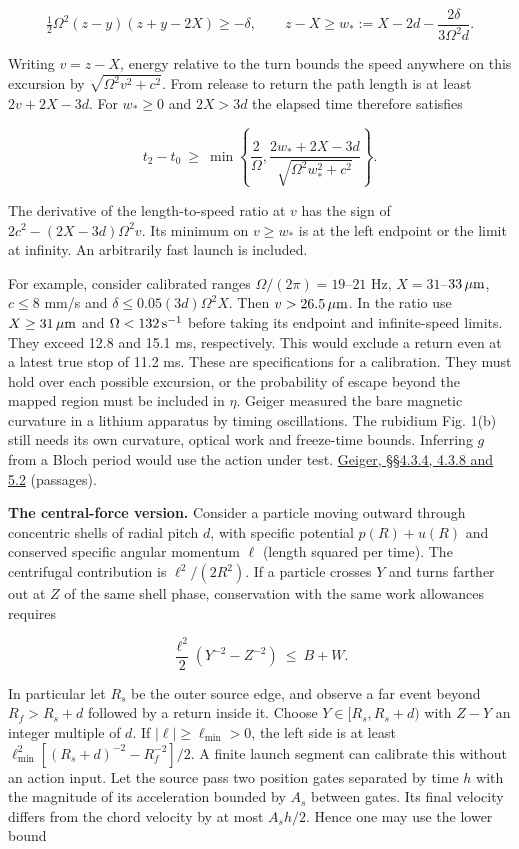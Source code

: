 \documentclass[11pt,a4paper]{article}
\begin{document}
\[
  \tfrac12\Omega^2(z-y)(z+y-2X)\ge-\delta,\qquad
  z-X\ge w_*:=X-2d-\frac{2\delta}{3\Omega^2d}.
\]

Writing \(v=z-X\), energy relative to the turn bounds the speed anywhere
on this excursion by \(\sqrt{\Omega^2v^2+c^2}\). From release to return
the path length is at least \(2v+2X-3d\). For \(w_*\ge0\) and \(2X>3d\)
the elapsed time therefore satisfies

\[
 t_2-t_0\ \ge\
 \min\left\{\frac{2}{\Omega},
       \frac{2w_*+2X-3d}{\sqrt{\Omega^2w_*^2+c^2}}\right\}.
\]

The derivative of the length-to-speed ratio at \(v\) has the sign of
\(2c^2-(2X-3d)\Omega^2v\). Its minimum on \(v\ge w_*\) is at the left
endpoint or the limit at infinity. An arbitrarily fast launch is
included.

For example, consider calibrated ranges \(\Omega/(2\pi)=19\)--\(21\) Hz,
\(X=31\)--\(33\,\mu{\rm m}\), \(c\le8\) mm/s and
\(\delta\le0.05(3d)\Omega^2X\). Then \(v>26.5\,\mu{\rm m}\). In the
ratio use \(X\ge31\,\mu{\rm m}\) and \(\Omega<132\,{\rm s}^{-1}\) before
taking its endpoint and infinite-speed limits. They exceed 12.8 and 15.1
ms, respectively. This would exclude a return even at a latest true stop
of 11.2 ms. These are specifications for a calibration. They must hold
over each possible excursion, or the probability of escape beyond the
mapped region must be included in \(\eta\). Geiger measured the bare
magnetic curvature in a lithium apparatus by timing oscillations. The
rubidium Fig. 1(b) still needs its own curvature, optical work and
freeze-time bounds. Inferring \(g\) from a Bloch period would use the
action under test.
\href{https://web.physics.ucsb.edu/~weld/publications/Geiger.pdf}{Geiger,
§§4.3.4, 4.3.8 and 5.2} (passages).

\textbf{The central-force version.} Consider a particle moving outward
through concentric shells of radial pitch \(d\), with specific potential
\(p(R)+u(R)\) and conserved specific angular momentum \(\ell\) (length
squared per time). The centrifugal contribution is \(\ell^2/(2R^2)\). If
a particle crosses \(Y\) and turns farther out at \(Z\) of the same
shell phase, conservation with the same work allowances requires

\[
                 \frac{\ell^2}{2}(Y^{-2}-Z^{-2})\ \le\ B+W.
\]

In particular let \(R_s\) be the outer source edge, and observe a far
event beyond \(R_f>R_s+d\) followed by a return inside it. Choose
\(Y\in[R_s,R_s+d)\) with \(Z-Y\) an integer multiple of \(d\). If
\(|\ell|\ge\ell_{\min}>0\), the left side is at least
\(\ell_{\min}^2[(R_s+d)^{-2}-R_f^{-2}]/2\). A finite launch segment can
calibrate this without an action input. Let the source pass two position
gates separated by time \(h\) with the magnitude of its acceleration
bounded by \(A_s\) between gates. Its final velocity differs from the
chord velocity by at most \(A_sh/2\). Hence one may use the lower bound
\end{document}
